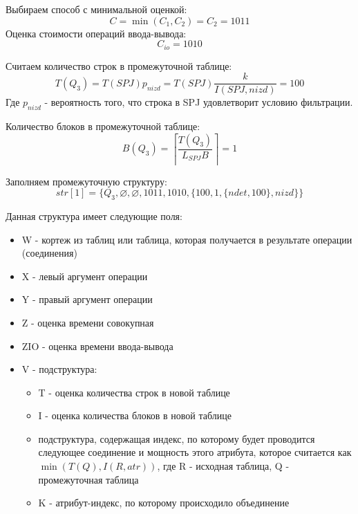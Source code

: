 \documentclass[russian,utf8,emptystyle]{eskdtext}
\begin{document}
Выбираем способ с минимальной оценкой:
$$
C = \min(C_1, C_2) = C_2 = 1011
$$
Оценка стоимости операций ввода-вывода:
$$
C_{io} = 1010
$$

Считаем количество строк в промежуточной таблице:
$$
T(Q_3) = T(SPJ)p_{nizd} = T(SPJ)\frac{k}{I(SPJ,nizd)} = 100
$$
Где $p_{nizd}$ - вероятность того, что строка в SPJ удовлетворит условию фильтрации.

Количество блоков в промежуточной таблице:
$$
B(Q_3) = \left\lceil \frac{T(Q_3)}{L_{SPJ}B} \right\rceil = 1
$$

Заполняем промежуточную структуру:
$$
str[1] = \{Q_3, \varnothing, \varnothing, 1011, 1010, \{100, 1, \{ndet, 100\}, nizd\}\}
$$

Данная структура имеет следующие поля:
\begin{itemize}
\item W - кортеж из таблиц или таблица, которая получается в результате операции (соединения)
\item X - левый аргумент операции
\item Y - правый аргумент операции
\item Z - оценка времени совокупная
\item ZIO - оценка времени ввода-вывода
\item V - подструктура:
\begin{itemize}
\item T - оценка количества строк в новой таблице
\item I - оценка количества блоков в новой таблице
\item подструктура, содержащая индекс, по которому будет проводится следующее соединение и мощность этого атрибута, которое считается как $\min(T(Q), I(R, atr))$, где R - исходная таблица, Q - промежуточная таблица
\item K - атрибут-индекс, по которому происходило объединение
\end{itemize}
\end{itemize}
\end{document}
